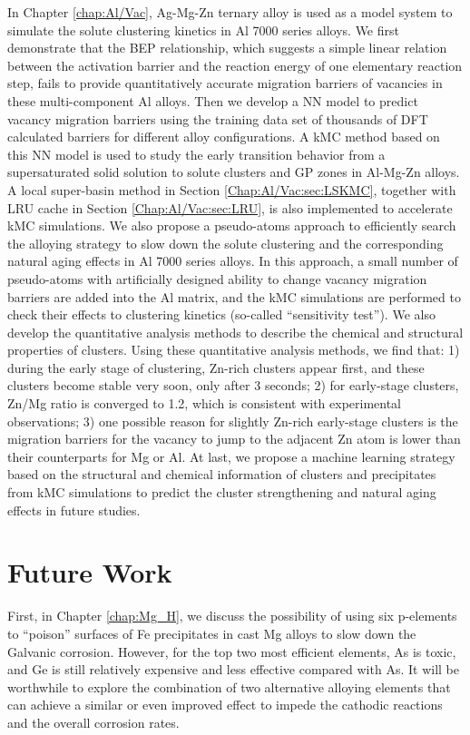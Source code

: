 In Chapter \ref{chap:Al/Vac}, Ag-Mg-Zn ternary alloy is used as a model system to simulate the solute clustering kinetics in Al 7000 series alloys. We first demonstrate that the \acf{BEP} relationship, which suggests a simple linear relation between the activation barrier and the reaction energy of one elementary reaction step, fails to provide quantitatively accurate migration barriers of vacancies in these multi-component Al alloys. Then we develop a \ac{NN} model to predict vacancy migration barriers using the training data set of thousands of \ac{DFT} calculated barriers for different alloy configurations. A \ac{kMC} method based on this \ac{NN} model is used to study the early transition behavior from a supersaturated solid solution to solute clusters and \acf{GP} zones in Al-Mg-Zn alloys. A local super-basin method  in Section \ref{Chap:Al/Vac:sec:LSKMC}, together with \ac{LRU} cache in Section \ref{Chap:Al/Vac:sec:LRU}, is also implemented to accelerate \ac{kMC} simulations. We also propose a pseudo-atoms approach to efficiently search the alloying strategy to slow down the solute clustering and the corresponding natural aging effects in Al 7000 series alloys. In this approach, a small number of pseudo-atoms with artificially designed ability to change vacancy migration barriers are added into the Al matrix, and the \ac{kMC} simulations are performed to check their effects to clustering kinetics (so-called ``sensitivity test''). We also develop the quantitative analysis methods to describe the chemical and structural properties of clusters. Using these quantitative analysis methods, we find that: 1) during the early stage of clustering, Zn-rich clusters appear first, and these clusters become stable very soon, only after 3 seconds; 2) for early-stage clusters, Zn/Mg ratio is converged to 1.2, which is consistent with experimental observations; 3) one possible reason for slightly Zn-rich early-stage clusters is the migration barriers for the vacancy to jump to the adjacent Zn atom is lower than their counterparts for Mg or Al. At last, we propose a machine learning strategy based on the structural and chemical information of clusters and precipitates from \ac{kMC} simulations to predict the cluster strengthening and natural aging effects in future studies.

\section{Future Work}

First, in Chapter \ref{chap:Mg_H}, we discuss the possibility of using six p-elements to ``poison'' surfaces of Fe precipitates in cast Mg alloys to slow down the Galvanic corrosion. However, for the top two most efficient elements, As is toxic, and Ge is still relatively expensive and less effective compared with As. It will be worthwhile to explore the combination of two alternative alloying elements that can achieve a similar or even improved effect to impede the cathodic reactions and the overall corrosion rates.

